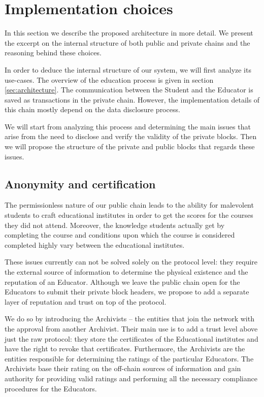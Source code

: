 
\section{Implementation choices}
In this section we describe the proposed architecture in more detail. We present the excerpt on the internal structure of both public and private chains and the reasoning behind these choices.

In order to deduce the internal structure of our system, we will first analyze its use-cases. The overview of the education process is given in section \ref{sec:architecture}. The communication between the Student and the Educator is saved as transactions in the private chain. However, the implementation details of this chain mostly depend on the data disclosure process.

We will start from analyzing this process and determining the main issues that arise from the need to disclose and verify the validity of the private blocks. Then we will propose the structure of the private and public blocks that regards these issues.

\subsection{Anonymity and certification}
\label{sec:cert}
The permissionless nature of our public chain leads to the ability for malevolent students to craft educational institutes in order to get the scores for the courses they did not attend. Moreover, the knowledge students actually get by completing the course and conditions upon which the course is considered completed highly vary between the educational institutes.

These issues currently can not be solved solely on the protocol level: they require the external source of information to determine the physical existence and the reputation of an Educator. Although we leave the public chain open for the Educators to submit their private block headers, we propose to add a separate layer of reputation and trust on top of the protocol.

We do so by introducing the Archivists -- the entities that join the network with the approval from another Archivist. Their main use is to add a trust level above just the raw protocol: they store the certificates of the Educational institutes and have the right to revoke that certificates. Furthermore, the Archivists are the entities responsible for determining the ratings of the particular Educators. The Archivists base their rating on the off-chain sources of information and gain authority for providing valid ratings and performing all the necessary compliance procedures for the Educators.

